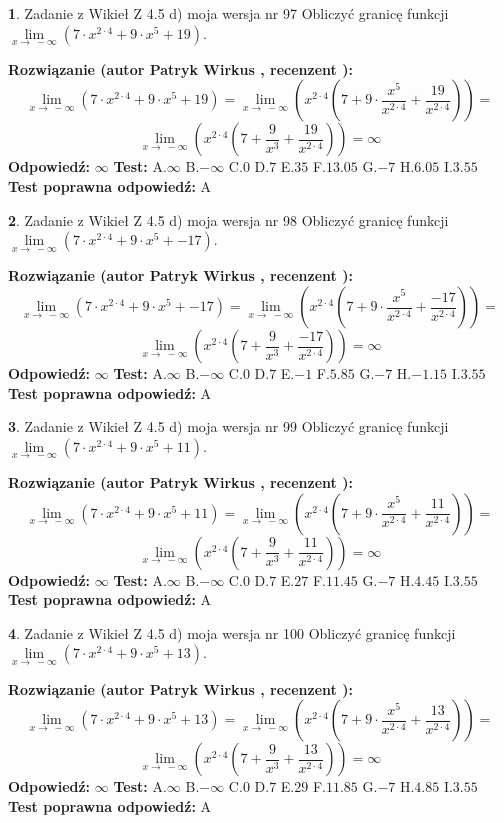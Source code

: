 \documentclass[12pt, a4paper]{article}
\theoremstyle{definition} %
\newtheorem{zad}{}
\newcommand{\zadStart}[1]{\begin{zad}#1\newline}
\newcommand{\zadStop}{\end{zad}}
\newcommand{\rozwStart}[2]{\noindent \textbf{Rozwiązanie (autor #1 , recenzent #2): }\newline}
\newcommand{\rozwStop}{\newline}
\newcommand{\odpStart}{\noindent \textbf{Odpowiedź:}\newline}
\newcommand{\odpStop}{\newline}
\newcommand{\testStart}{\noindent \textbf{Test:}\newline}
\newcommand{\testStop}{\newline}
\newcommand{\kluczStart}{\noindent \textbf{Test poprawna odpowiedź:}\newline}
\newcommand{\kluczStop}{\newline}
\begin{document}
\zadStart{Zadanie z Wikieł Z 4.5 d) moja wersja nr 97}
Obliczyć granicę funkcji  $\lim\limits_{x\to\ -\infty}(7 \cdot x^{2\cdot4}+9 \cdot x^{5}+19)$.
\zadStop
\rozwStart{Patryk Wirkus}{}
$$\lim\limits_{x\to\ -\infty}(7 \cdot x^{2\cdot4}+9 \cdot x^{5}+19) = \lim\limits_{x\to\ -\infty}(x^{2\cdot4}(7 +9 \cdot \frac{x^{5}}{x^{2\cdot4}}+\frac{19}{x^{2\cdot4}})) =$$ $$\lim\limits_{x\to\ -\infty}(x^{2\cdot4}(7 +\frac{9}{x^{3}}+\frac{19}{x^{2\cdot4}})) =\infty$$
\rozwStop
\odpStart
$\infty$
\odpStop
\testStart
A.$\infty$ B.$-\infty$ C.$0$ D.$7$ E.$35$
F.$13.05$ G.$-7$
H.$6.05$
I.$3.55$
\testStop
\kluczStart
A
\kluczStop



\zadStart{Zadanie z Wikieł Z 4.5 d) moja wersja nr 98}
Obliczyć granicę funkcji  $\lim\limits_{x\to\ -\infty}(7 \cdot x^{2\cdot4}+9 \cdot x^{5}+-17)$.
\zadStop
\rozwStart{Patryk Wirkus}{}
$$\lim\limits_{x\to\ -\infty}(7 \cdot x^{2\cdot4}+9 \cdot x^{5}+-17) = \lim\limits_{x\to\ -\infty}(x^{2\cdot4}(7 +9 \cdot \frac{x^{5}}{x^{2\cdot4}}+\frac{-17}{x^{2\cdot4}})) =$$ $$\lim\limits_{x\to\ -\infty}(x^{2\cdot4}(7 +\frac{9}{x^{3}}+\frac{-17}{x^{2\cdot4}})) =\infty$$
\rozwStop
\odpStart
$\infty$
\odpStop
\testStart
A.$\infty$ B.$-\infty$ C.$0$ D.$7$ E.$-1$
F.$5.85$ G.$-7$
H.$-1.15$
I.$3.55$
\testStop
\kluczStart
A
\kluczStop



\zadStart{Zadanie z Wikieł Z 4.5 d) moja wersja nr 99}
Obliczyć granicę funkcji  $\lim\limits_{x\to\ -\infty}(7 \cdot x^{2\cdot4}+9 \cdot x^{5}+11)$.
\zadStop
\rozwStart{Patryk Wirkus}{}
$$\lim\limits_{x\to\ -\infty}(7 \cdot x^{2\cdot4}+9 \cdot x^{5}+11) = \lim\limits_{x\to\ -\infty}(x^{2\cdot4}(7 +9 \cdot \frac{x^{5}}{x^{2\cdot4}}+\frac{11}{x^{2\cdot4}})) =$$ $$\lim\limits_{x\to\ -\infty}(x^{2\cdot4}(7 +\frac{9}{x^{3}}+\frac{11}{x^{2\cdot4}})) =\infty$$
\rozwStop
\odpStart
$\infty$
\odpStop
\testStart
A.$\infty$ B.$-\infty$ C.$0$ D.$7$ E.$27$
F.$11.45$ G.$-7$
H.$4.45$
I.$3.55$
\testStop
\kluczStart
A
\kluczStop



\zadStart{Zadanie z Wikieł Z 4.5 d) moja wersja nr 100}
Obliczyć granicę funkcji  $\lim\limits_{x\to\ -\infty}(7 \cdot x^{2\cdot4}+9 \cdot x^{5}+13)$.
\zadStop
\rozwStart{Patryk Wirkus}{}
$$\lim\limits_{x\to\ -\infty}(7 \cdot x^{2\cdot4}+9 \cdot x^{5}+13) = \lim\limits_{x\to\ -\infty}(x^{2\cdot4}(7 +9 \cdot \frac{x^{5}}{x^{2\cdot4}}+\frac{13}{x^{2\cdot4}})) =$$ $$\lim\limits_{x\to\ -\infty}(x^{2\cdot4}(7 +\frac{9}{x^{3}}+\frac{13}{x^{2\cdot4}})) =\infty$$
\rozwStop
\odpStart
$\infty$
\odpStop
\testStart
A.$\infty$ B.$-\infty$ C.$0$ D.$7$ E.$29$
F.$11.85$ G.$-7$
H.$4.85$
I.$3.55$
\testStop
\kluczStart
A
\kluczStop
\end{document}
